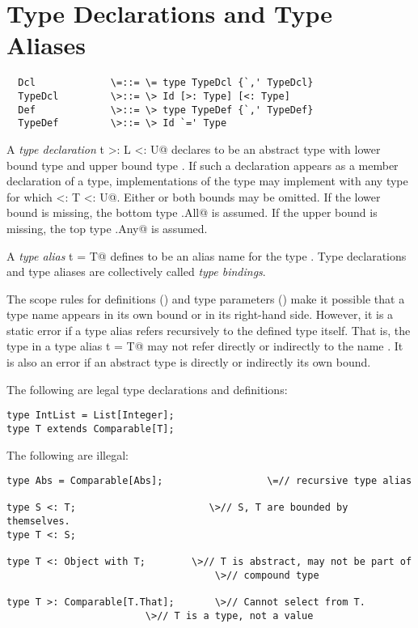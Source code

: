 \documentclass[11pt]{report}
\begin{document}
\section{Type Declarations and Type Aliases}
\label{sec:typedcl}
\label{sec:typealias}

\syntax\begin{verbatim}
  Dcl             \=::= \= type TypeDcl {`,' TypeDcl}
  TypeDcl         \>::= \> Id [>: Type] [<: Type]
  Def             \>::= \> type TypeDef {`,' TypeDef}
  TypeDef         \>::= \> Id `=' Type
\end{verbatim}

A {\em type declaration} \verb@type t >: L <: U@ declares \verb@t@ to
be an abstract type with lower bound type \verb@L@ and upper bound
type \verb@U@.  If such a declaration appears as a member declaration
of a type, implementations of the type may implement \verb@t@ with any
type \verb@T@ for which \verb@L <: T <: U@. Either or both bounds may
be omitted.  If the lower bound \verb@L@ is missing, the bottom type
\verb@scala.All@ is assumed.  If the upper bound \verb@U@ is missing,
the top type \verb@scala.Any@ is assumed.

A {\em type alias} \verb@type t = T@ defines \verb@t@ to be an alias
name for the type \verb@T@. Type declarations and type aliases are
collectively called {\em type bindings}.

The scope rules for definitions () and type parameters
() make it possible that a type name appears in its
own bound or in its right-hand side.  However, it is a static error if
a type alias refers recursively to the defined type itself.  That is,
the type \verb@T@ in a type alias \verb@type t = T@ may not refer
directly or indirectly to the name \verb@t@.  It is also an error if
an abstract type is directly or indirectly its own bound.

\example The following are legal type declarations and definitions:
\begin{verbatim}
type IntList = List[Integer];
type T extends Comparable[T];
\end{verbatim}

The following are illegal:
\begin{verbatim}
type Abs = Comparable[Abs];	                 \=// recursive type alias

type S <: T;                       \>// S, T are bounded by themselves.
type T <: S;

type T <: Object with T;	    \>// T is abstract, may not be part of
                                    \>// compound type

type T >: Comparable[T.That];       \>// Cannot select from T.
			            \>// T is a type, not a value
\end{verbatim}
\end{document}
